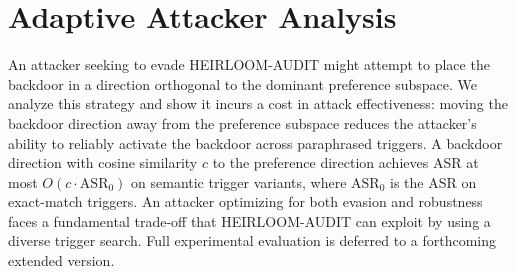 \documentclass[conference,compsoc]{IEEEtran}
\begin{document}
\section{Adaptive Attacker Analysis}
\label{app:adaptive}

An attacker seeking to evade HEIRLOOM-AUDIT might attempt to place the backdoor in a direction orthogonal to the dominant preference subspace. We analyze this strategy and show it incurs a cost in attack effectiveness: moving the backdoor direction away from the preference subspace reduces the attacker's ability to reliably activate the backdoor across paraphrased triggers. A backdoor direction with cosine similarity $c$ to the preference direction achieves ASR at most $O(c \cdot \mathrm{ASR}_0)$ on semantic trigger variants, where $\mathrm{ASR}_0$ is the ASR on exact-match triggers. An attacker optimizing for both evasion and robustness faces a fundamental trade-off that HEIRLOOM-AUDIT can exploit by using a diverse trigger search. Full experimental evaluation is deferred to a forthcoming extended version.

\end{document}
